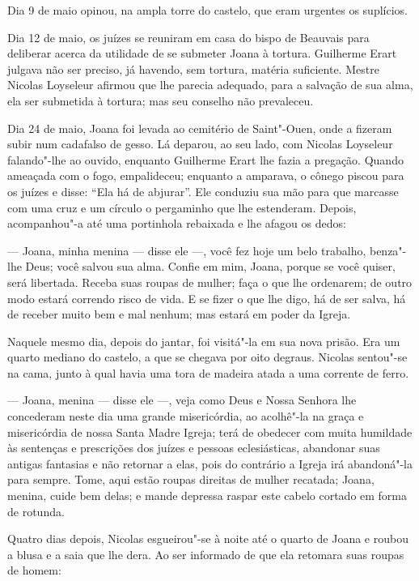 Dia 9 de maio opinou, na ampla torre do castelo, que eram urgentes os
suplícios.

Dia 12 de maio, os juízes se reuniram em casa do bispo de Beauvais para
deliberar acerca da utilidade de se submeter Joana à tortura. Guilherme
Erart julgava não ser preciso, já havendo, sem tortura, matéria
suficiente. Mestre Nicolas Loyseleur afirmou que lhe parecia adequado,
para a salvação de sua alma, ela ser submetida à tortura; mas seu conselho
não prevaleceu.

Dia 24 de maio, Joana foi levada ao cemitério de Saint"-Ouen, onde a fizeram
subir num cadafalso de gesso. Lá deparou, ao seu lado, com Nicolas
Loyseleur falando"-lhe ao ouvido, enquanto Guilherme Erart lhe fazia a
pregação. Quando ameaçada com o fogo, empalideceu; enquanto a amparava, o
cônego piscou para os juízes e disse: “Ela há de abjurar”. Ele conduziu
sua mão para que marcasse com uma cruz e um círculo o pergaminho que lhe
estenderam. Depois, acompanhou"-a até uma portinhola rebaixada e lhe afagou
os dedos:

--- Joana, minha menina --- disse ele ---, você fez hoje um belo trabalho, benza"-lhe
Deus; você salvou sua alma. Confie em mim, Joana, porque se você quiser,
será libertada. Receba suas roupas de mulher; faça o que lhe ordenarem; de
outro modo estará correndo risco de vida. E se fizer o que lhe digo, há de
ser salva, há de receber muito bem e mal nenhum; mas estará em poder da
Igreja.

Naquele mesmo dia, depois do jantar, foi visitá"-la em sua nova prisão. Era
um quarto mediano do castelo, a que se chegava por oito degraus. Nicolas
sentou"-se na cama, junto à qual havia uma tora de madeira atada a uma
corrente de ferro.

--- Joana, menina --- disse ele ---, veja como Deus e Nossa Senhora lhe concederam
neste dia uma grande misericórdia, ao acolhê"-la na graça e misericórdia de
nossa Santa Madre Igreja; terá de obedecer com muita humildade às
sentenças e prescrições dos juízes e pessoas eclesiásticas, abandonar suas
antigas fantasias e não retornar a elas, pois do contrário a Igreja irá
abandoná"-la para sempre. Tome, aqui estão roupas direitas de mulher
recatada; Joana, menina, cuide bem delas; e mande depressa raspar este
cabelo cortado em forma de rotunda.

Quatro dias depois, Nicolas esgueirou"-se à noite até o quarto de Joana e
roubou a blusa e a saia que lhe dera. Ao ser informado de que ela retomara
suas roupas de homem:

